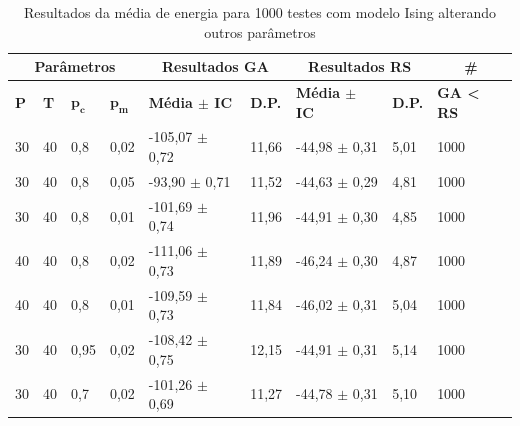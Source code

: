 \begin{table}[h!]
	\centering
	\begin{tabular}{|l|l|l|l|l|l|l|l|l|}
		\hline
		\multicolumn{4}{|c|}{\textbf{Parâmetros}}                                                    & \multicolumn{2}{c|}{\textbf{Resultados GA}}                                        & \multicolumn{2}{c|}{\textbf{Resultados RS}}                                        & \multicolumn{1}{c|}{\textbf{\#}}                      \\ \hline
		\textbf{P} & \textbf{T} & $\bm{p_c}$ & $\bm{p_m}$ & \textbf{Média $\pm$ IC} & \textbf{D.P.} & \textbf{Média $\pm$ IC} & \textbf{D.P.} & \textbf{GA < RS} \\ \hline
		30                          & 40                          & 0,8        & 0,02       & -105,07 $\pm$ 0,72                           & 11,66                          & -44,98 $\pm$ 0,31                            & 5,01                           & 1000                                      \\ \hline
		30                          & 40                          & 0,8        & 0,05       & -93,90 $\pm$ 0,71                            & 11,52                          & -44,63 $\pm$ 0,29                            & 4,81                           & 1000                                      \\ \hline
		30                          & 40                          & 0,8        & 0,01       & -101,69 $\pm$ 0,74                           & 11,96                          & -44,91 $\pm$ 0,30                            & 4,85                           & 1000                                      \\ \hline
		40                          & 40                          & 0,8        & 0,02       & -111,06 $\pm$ 0,73                           & 11,89                          & -46,24 $\pm$ 0,30                            & 4,87                           & 1000                                      \\ \hline
		40                          & 40                          & 0,8        & 0,01       & -109,59 $\pm$ 0,73                           & 11,84                          & -46,02 $\pm$ 0,31                            & 5,04                           & 1000                                      \\ \hline
		30                          & 40                          & 0,95       & 0,02       & -108,42 $\pm$ 0,75                           & 12,15                          & -44,91 $\pm$ 0,31                            & 5,14                           & 1000                                      \\ \hline
		30                          & 40                          & 0,7        & 0,02       & -101,26 $\pm$ 0,69                           & 11,27                          & -44,78 $\pm$ 0,31                            & 5,10                           & 1000                                      \\ \hline
	\end{tabular}
	\caption{Resultados da média de energia para 1000 testes com modelo Ising alterando outros parâmetros}
	\label{tab:resultados_teste3}
\end{table}

